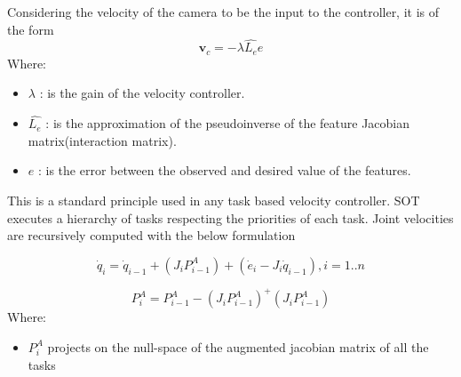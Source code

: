 Considering the velocity of the camera to be the input to the controller, it is of the form
\[\mathbf{v}_{c}= -\lambda\widehat{L_{e}}e\]
Where:
\begin{itemize}[label=]
    \item \textit{ $\lambda$ }: is the gain of the velocity controller.
    \item \textit{ $\widehat{L_{e}}$ }: is the approximation of the pseudoinverse of the feature Jacobian matrix(interaction matrix).
    \item \textit{ $e$ }: is the error between the observed and desired value of the features.
\end{itemize}
This is a standard principle used in any task based velocity controller. SOT executes a hierarchy of tasks respecting the priorities 
of each task. Joint velocities are recursively computed with the below formulation\cite{Mansard2009}

\[\dot{q}_{i} = \dot{q}_{i-1} + (J_{i}P^{A}_{i-1}) + (\dot{e}_{i}-J_{i}\dot{q}_{i-1}), i=1..n\]

\[P^{A}_{i} = P^{A}_{i-1} - (J_{i}P^{A}_{i-1})^+ (J_{i}P^{A}_{i-1})                          \]
Where:
\begin{itemize}[label=]
    \item $P^{A}_{i}$ projects on the null-space of the augmented jacobian matrix of all the tasks
\end{itemize}

